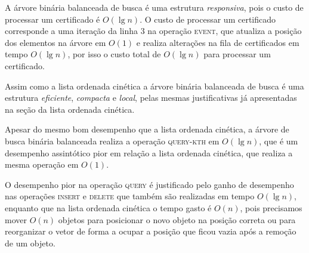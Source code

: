 A árvore binária balanceada de busca é uma estrutura \textit{responsiva}, pois o
custo de processar um certificado é $O(\lg{n})$.
O custo de processar um certificado corresponde a uma iteração da linha $3$ na operação
\textsc{event}, que atualiza a posição dos elementos na árvore em $O(1)$ e realiza alterações na
fila de certificados em tempo $O(\lg{n})$, por isso o custo total de $O(\lg{n})$
para processar um certificado.

Assim como a lista ordenada cinética a árvore binária balanceada de busca é uma
estrutura \textit{eficiente}, \textit{compacta} e \textit{local}, pelas mesmas
justificativas já apresentadas na seção da lista ordenada cinética.

Apesar do mesmo bom desempenho que a lista ordenada cinética, a árvore de busca
binária balanceada realiza a operação \textsc{query-kth} em $O(\lg{n})$, que é um
desempenho assintótico pior em relação a lista ordenada cinética, que realiza a
mesma operação em $O(1)$.

O desempenho pior na operação \textsc{query} é justificado pelo ganho de
desempenho nas operações \textsc{insert} e \textsc{delete} que também são
realizadas em tempo $O(\lg{n})$, enquanto que na lista ordenada cinética o tempo
gasto é $O(n)$, pois precisamos mover $O(n)$ objetos para posicionar o novo
objeto na posição correta ou para reorganizar o vetor de forma a ocupar a
posição que ficou vazia após a remoção de um objeto.

